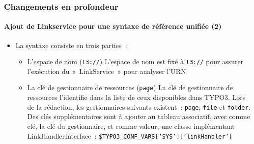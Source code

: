 \begin{frame}[fragile]
	\frametitle{Changements en profondeur}
	\framesubtitle{Ajout de Linkservice pour une syntaxe de référence unifiée (2)}

	\begin{itemize}

		\item La syntaxe consiste en trois parties~:

			\begin{itemize}

				\item L'espace de nom (\texttt{t3://})\newline
		   			L'espace de nom est fixé à \texttt{t3://} pour assurer l'exécution du «~LinkService~» pour analyser l'URN.
					\newline
				\item La clé de gestionnaire de ressources (\texttt{page})\newline
   					La clé de gestionnaire de ressources l'identifie dans la liste de ceux disponibles dans TYPO3.
					Lors de la rédaction, les gestionnaires suivants existent~: \texttt{page}, \texttt{file} et \texttt{folder}.\newline
					Des clés supplémentaires sont à ajouter au tableau associatif, avec comme clé, la clé du gestionnaire, et
					comme valeur, une classe implémentant LinkHandlerInterface~:\newline
					\texttt{\$TYPO3\_CONF\_VARS['SYS']['linkHandler']}

			\end{itemize}

	\end{itemize}

\end{frame}

